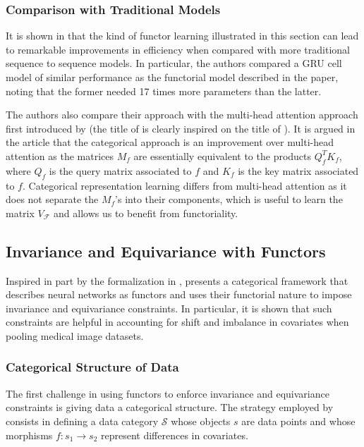 \documentclass[12pt,a4paper,openright,twoside]{report}
\theoremstyle{plain}
\theoremstyle{definition}
\begin{document}
\subsubsection{Comparison with Traditional Models}

It is shown in \cite{sheshmani2021categorical} that the kind of functor learning illustrated in this section can lead to remarkable improvements in efficiency when compared with more traditional sequence to sequence models. In particular, the authors compared a GRU cell model of similar performance as the functorial model described in the paper, noting that the former needed 17 times more parameters than the latter.


The authors also compare their approach with the multi-head attention approach first introduced by \cite{vaswani2017attention} (the title of \cite{sheshmani2021categorical} is clearly inspired on the title of \cite{vaswani2017attention}). It is argued in the article that the categorical approach is an improvement over multi-head attention as the matrices $M_f$ are essentially equivalent to the products $Q_f^TK_f$, where $Q_f$ is the query matrix associated to $f$ and $K_f$ is the key matrix associated to $f$. Categorical representation learning differs from multi-head attention as it does not separate the $M_f$'s into their components, which is useful to learn the matrix $V_{\mathcal{F}}$ and allows us to benefit from functoriality. 


\subsection{Invariance and Equivariance with Functors}

Inspired in part by the formalization in \cite{gavranovic2019compositional}, \cite{chytas2024poolingimagedatasetsmultiple} presents a categorical framework that describes neural networks as functors and uses their functorial nature to impose invariance and equivariance constraints. In particular, it is shown that such constraints are helpful in accounting for shift and imbalance in covariates when pooling medical image datasets.


\subsubsection{Categorical Structure of Data}

The first challenge in using functors to enforce invariance and equivariance constraints is giving data a categorical structure. The strategy employed by \cite{chytas2024poolingimagedatasetsmultiple} consists in defining a data category $\mathcal{S}$ whose objects $s$ are data points and whose morphisms $f: s_1 \to s_2$ represent differences in covariates. 
\end{document}
